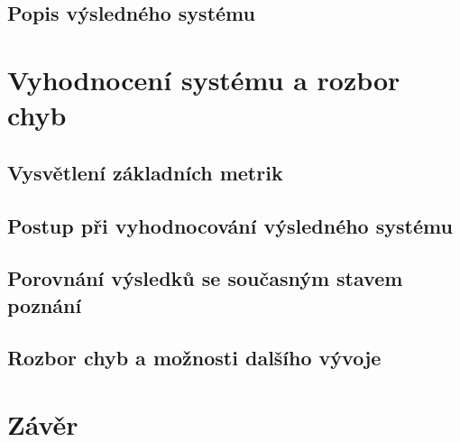 \section{Popis výsledného systému}






\chapter{Vyhodnocení systému a rozbor chyb}
\label{system_evaluation}



\section{Vysvětlení základních metrik}


\section{Postup při vyhodnocování výsledného systému}


\section{Porovnání výsledků se současným stavem poznání}


\section{Rozbor chyb a možnosti dalšího vývoje}




\chapter{Závěr}
\label{conclusion}



